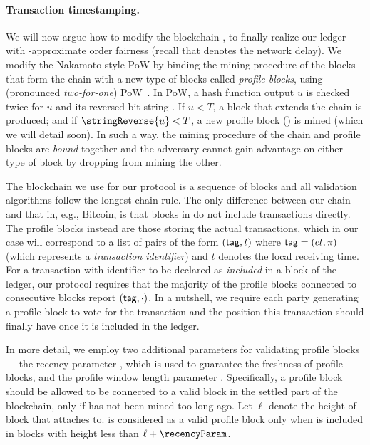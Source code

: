 \paragraph{Transaction timestamping.}
%
We will now argue how to modify the blockchain \chain, to finally realize our ledger with \delay-approximate order fairness (recall that \delay denotes the network delay).
%
We modify the Nakamoto-style PoW \chain by binding the mining procedure of the blocks that form the chain \chain with a new type of blocks called \emph{profile blocks}, using \twoforone (pronounced \emph{two-for-one}) PoW~\cite{EC:GarKiaLeo15}.
%
In \twoforone PoW, a hash function output $u$ is checked twice for $u$ and its reversed bit-string .
%
If $u< T$, a block that extends the chain \chain is produced; and if $\stringReverse{u} < T$, a new profile block (\PB) is mined (which we will detail soon).
%
In such a way, the mining procedure of the chain \chain and profile blocks are \emph{bound} together and the adversary cannot gain advantage on either type of block by dropping from mining the other.

The blockchain \chain we use for our protocol is a sequence of blocks and all validation algorithms follow the longest-chain rule.
%
The only difference between our chain \chain and that in, e.g., Bitcoin, is that blocks in \chain do not include transactions directly.
%
The profile blocks instead are those storing the actual transactions, which in our case will correspond to a list of pairs of the form $(\mathsf{tag}, t)$ where $\mathsf{tag}=(ct, \pi)$ (which represents a \emph{transaction identifier}) and $t$ denotes the local receiving time.
%
For a transaction \tx with identifier \txTag to be declared as \emph{included} in a block \block of the ledger, our protocol requires that the majority of the profile blocks connected to \PBWindowLen consecutive blocks report $(\mathsf{tag}, \cdot)$.
%
In a nutshell, we require each party generating a profile block to vote for the transaction and the position this transaction should finally have once it is included in the ledger.

In more detail, we employ two additional parameters for validating profile blocks --- the recency parameter \recencyParam, which is used to guarantee the freshness of profile blocks, and the profile window length parameter \PBWindowLen.
%
Specifically, a profile block \PB should be allowed to be connected to a valid block \block in the settled part of the blockchain, only if \PB has not been mined too long ago.
%
Let $\ell$ denote the height of block \block that \PB attaches to.
%
\PB is considered as a valid profile block only when \PB is included in blocks with height less than $\ell + \recencyParam$.

